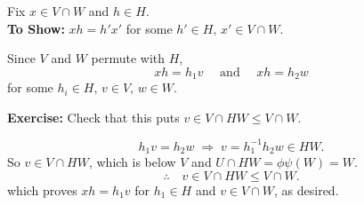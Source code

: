 \documentclass[xcolor=dvipsnames,11pt,hide notes]{beamer}
\theoremstyle{definition}
\theoremstyle{remark}
\newtheorem*{computations}{Computations}
\numberwithin{theorem}{section}
\numberwithin{claim}{section}
\numberwithin{equation}{section}
\numberwithin{conjecture}{section}
\begin{document}

\begin{frame}[fragile,label=ComputationsForProofOfIntervalIsomorphism,shrink=5]{}
      Fix $x \in V \cap W$ and $h\in H$.\\[6pt]  
      {\bf To Show:} $xh = h'x'$ for some $h'\in H, \, x'\in V\cap W$.
\end{frame}
\begin{frame}[fragile,label=ComputationsForProofOfIntervalIsomorphism,shrink=5]{}
          Since $V$ and $W$ permute with $H$, 
          \[xh = h_1 v \quad \text{ and } \quad xh = h_2 w\]
          for some $h_i\in H,\,v \in V,\, w \in W$.
\end{frame}
\begin{frame}[fragile,label=ComputationsForProofOfIntervalIsomorphism,shrink=5]{}
          {\bf Exercise:} Check that this puts $v\in V \cap HW \leq V \cap W$. 
\end{frame}
\begin{frame}[fragile,label=ComputationsForProofOfIntervalIsomorphism,shrink=5]{}
            \[h_1 v = h_2 w \;\Rightarrow \; v = h_1^{-1}h_2 w \in HW.\]
            So $v\in V \cap HW$, which is below $V$ and
            $U\cap HW = \phi \psi(W) = W$.  
            \[\therefore \quad v \in V \cap HW \leq V \cap W.\]
            which proves $xh = h_1 v$ for $h_1\in H$ and $v \in V\cap W$, as
            desired.
\end{frame}
\end{document}
